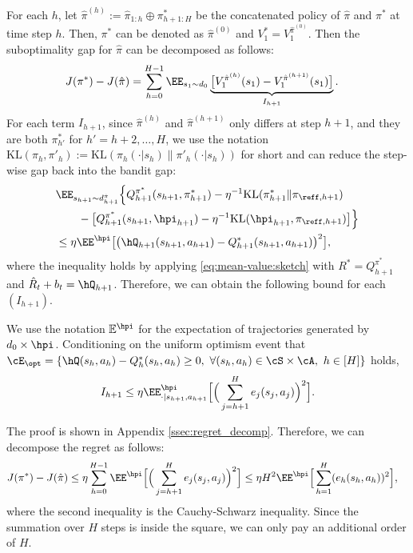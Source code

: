 \documentclass[11pt]{article}
\newcommand{\E}{\mathbb E}
\newcommand{\KL}{\mathrm{KL}}
\begin{document}
For each $h$, let $\hat \pi^{(h)} := \hat \pi_{1:h} \oplus \pi^*_{h+1:H}$ be the concatenated policy of $\hat \pi$ and $\pi^*$ at time step $h$. Then, $\pi^*$ can be denoted as $\hat\pi^{(0)}$ and $V_1^*=V_1^{\hat\pi^{(0)}}$. %
Then the suboptimality gap for $\hat \pi$ can be decomposed as follows: 
$$
\begin{aligned} 
    J(\pi^*) - J(\hat \pi) &= \sum_{h = 0}^{H - 1} \EE_{s_1 \sim d_0} \underbrace{\bigl[V_1^{\hat \pi^{(h)}}(s_1) - V_1^{\hat \pi^{(h + 1)}}(s_1)\bigr]}_{I_{h + 1}}.
\end{aligned}
$$
For each term $I_{h + 1}$, since $\hat \pi^{(h)}$ and $\hat \pi^{(h+1)}$ only differs at step $h+1$, and they are both $\pi_{h'}^*$ for $h'=h+2,\ldots,H$, we use the notation $\KL(\pi_h,\pi'_h):=\KL(\pi_h(\cdot|s_h)\|\pi'_h(\cdot|s_h))$ for short and can reduce the step-wise gap back into the bandit gap:
\begin{equation*}
\begin{aligned}
&\EE_{s_{h + 1} \sim d_{h + 1}^{\hat\pi}}\Big\{Q_{h + 1}^{\pi^*}(s_{h + 1}, \pi^*_{h+1}) - \eta^{-1}\KL(\pi_{h+1}^*\| \pi_{\reff,h+1})\\
    &\qquad - \bigl[Q_{h + 1}^{\pi^*}(s_{h + 1}, \hpi_{h+1}) - \eta^{-1}\KL(\hpi_{h+1}, \pi_{\reff,h+1})\bigr]\Big\}\\
    &\le \eta\EE^{\hpi}\big[\big(\hQ_{h + 1}(s_{h + 1},a_{h+1}) - Q_{h + 1}^*(s_{h + 1},a_{h+1})\big)^2\big],
\end{aligned}
\end{equation*}
where the inequality holds by applying \eqref{eq:mean-value:sketch} with $R^*=Q_{h + 1}^{\pi^*}$ and $\hat{R}_t+b_t=\hQ_{h + 1}$. Therefore, we can obtain the following bound for each $(I_{h + 1})$.
\begin{lemma}\label{lm:value decompose_mdp}
We use the notation $\E^{\hpi}$ for the expectation of trajectories generated by $d_0\times\hpi$.
Conditioning on the uniform optimism event that $\cE_{\opt}=\{\hQ(s_h,a_h)-Q^*_h(s_h,a_h) \ge 0,~\forall(s_h,a_h)\in\cS\times\cA,~h\in[H]\}$ holds,
$$
\begin{aligned}
    I_{h + 1} \le \eta\EE^{\hpi}_{\cdot|s_{h+1},a_{h+1}} \Big[\Big(\sum_{j=h+1}^H e_j(s_j,a_j) \Big)^2\Big].
\end{aligned}
$$
\end{lemma}
The proof is shown in Appendix \ref{ssec:regret_decomp}. Therefore, we can decompose the regret as follows:
$$
\begin{aligned}
    J(\pi^*) - J(\hat \pi) &\le \eta \sum_{h = 0}^{H - 1}\EE^{\hpi} \Big[\Big(\sum_{j=h+1}^H e_j(s_j,a_j) \Big)^2\Big]\le \eta H^2 \EE^{\hpi} \Big[\sum_{h=1}^H (e_h(s_h,a_h))^2\Big],
\end{aligned}
$$
where the second inequality is the Cauchy-Schwarz inequality. Since the summation over $H$ steps is inside the square, we can only pay an additional order of $H$.
\end{document}
